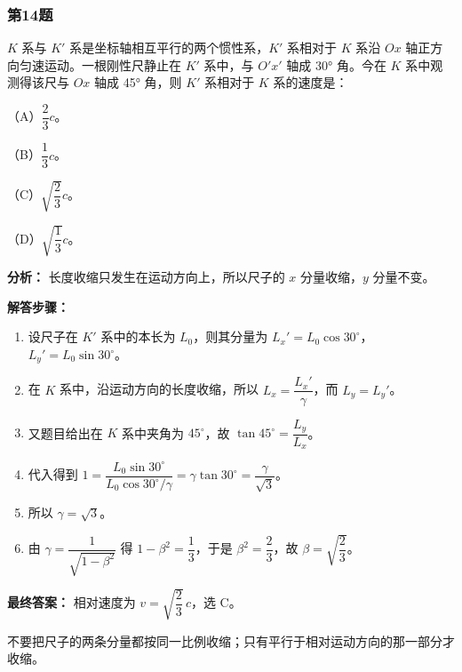 \documentclass[12pt,a4paper]{ctexart}
\begin{document}
\subsubsection*{第14题}
\begin{tcolorbox}[colback=gray!2!white,colframe=black!60,title={题目}]
\(K\) 系与 \(K'\) 系是坐标轴相互平行的两个惯性系，\(K'\) 系相对于 \(K\) 系沿 \(Ox\) 轴正方向匀速运动。一根刚性尺静止在 \(K'\) 系中，与 \(O'x'\) 轴成 30° 角。今在 \(K\) 系中观测得该尺与 \(Ox\) 轴成 45° 角，则 \(K'\) 系相对于 \(K\) 系的速度是：\par
（A）\(\dfrac{2}{3}c\)。\par
（B）\(\dfrac{1}{3}c\)。\par
（C）\(\sqrt{\dfrac{2}{3}}c\)。\par
（D）\(\sqrt{\dfrac{1}{3}}c\)。\par
\end{tcolorbox}
\begin{tcolorbox}[colback=blue!2!white,colframe=blue!55!black,title={完整答案}]
\textbf{分析：}
长度收缩只发生在运动方向上，所以尺子的 \(x\) 分量收缩，\(y\) 分量不变。\par
\textbf{解答步骤：}
\begin{enumerate}
\item 设尺子在 \(K'\) 系中的本长为 \(L_0\)，则其分量为 \(L_x'=L_0\cos 30^\circ\)，\(L_y'=L_0\sin 30^\circ\)。
\item 在 \(K\) 系中，沿运动方向的长度收缩，所以 \(L_x=\dfrac{L_x'}{\gamma}\)，而 \(L_y=L_y'\)。
\item 又题目给出在 \(K\) 系中夹角为 \(45^\circ\)，故 \(\tan 45^\circ=\dfrac{L_y}{L_x}\)。
\item 代入得到 \(1=\dfrac{L_0\sin 30^\circ}{L_0\cos 30^\circ/\gamma}=\gamma\tan 30^\circ=\dfrac{\gamma}{\sqrt{3}}\)。
\item 所以 \(\gamma=\sqrt{3}\)。
\item 由 \(\gamma=\dfrac{1}{\sqrt{1-\beta^2}}\) 得 \(1-\beta^2=\dfrac{1}{3}\)，于是 \(\beta^2=\dfrac{2}{3}\)，故 \(\beta=\sqrt{\dfrac{2}{3}}\)。
\end{enumerate}
\textbf{最终答案：}
相对速度为 \(v=\sqrt{\dfrac{2}{3}}\,c\)，选 C。\par
\end{tcolorbox}
\begin{tcolorbox}[colback=red!2!white,colframe=red!55!black,title={易错点}]
不要把尺子的两条分量都按同一比例收缩；只有平行于相对运动方向的那一部分才收缩。\par
\end{tcolorbox}
\end{document}
